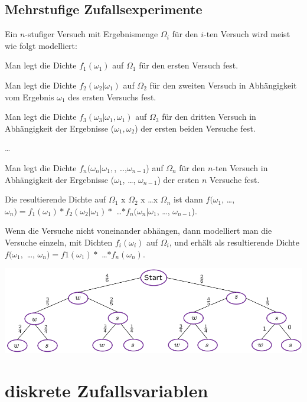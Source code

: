 \documentclass[10pt]{article}
\newtheorem[M]{definition}{Def.}
\newtheorem[M]{satz}{Satz}
\numberwithin{equation}{section}
\begin{document}
\subsection{Mehrstufige Zufallsexperimente}
Ein $n$-stufiger Versuch mit Ergebnismenge $\Omega_i$ für den $i$-ten Versuch wird meist wie folgt modelliert:
\begin{description}
	\item[(1)] Man legt die Dichte $f_1(\omega_1)$ auf $\Omega_1$ für den ersten Versuch fest.
	\item[(2)] Man legt die Dichte $f_2(\omega_2 | \omega_1)$ auf $\Omega_2$ für den zweiten Versuch in Abhängigkeit vom Ergebnis $\omega_1$ des ersten Versuchs fest.
	\item[(3)] Man legt die Dichte $f_3(\omega_3 | \omega_1, \omega_1)$ auf $\Omega_3$ für den dritten Versuch in Abhängigkeit der Ergebnisse ($\omega_1, \omega_2$) der ersten beiden Versuche fest.
	\item \dots
	\item[(n)] Man legt die Dichte $f_n( \omega_n | \omega_1,$, \dots,$\omega_{n-1}$) auf $\Omega_n$ für den $n$-ten Versuch in Abhängigkeit der Ergebnisse ($\omega_1$, \dots, $\omega_{n-1}$) der ersten $n$ Versuche fest. 
	\item[(n+1)] Die resultierende Dichte auf $\Omega_1$ x $\Omega_2$ x \dots x $\Omega_n$ ist dann $f(\omega_1$, \dots, $\omega_n) = f_1(\omega_1) * f_2(\omega_2 | \omega_1) * $ \dots $ * f_n(\omega_n | \omega_1$, \dots, $\omega_{n-1}$).
\end{description}
Wenn die Versuche nicht voneinander abhängen, dann modelliert man die Versuche einzeln, mit Dichten $f_i(\omega_i)$ auf $\Omega_i$, und erhält als resultierende Dichte $f(\omega_1,$ \dots, $\omega_n)=f1(\omega_1) *$ \dots $* f_n(\omega_n)$. \\
\begin{center}
	\includegraphics[scale=0.4]{mehrstuffigeW.png}
\end{center}

\newpage
\section{diskrete Zufallsvariablen}
\end{document}
